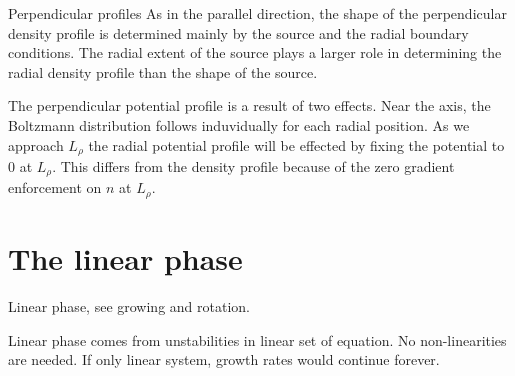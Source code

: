 Perpendicular profiles
As in the parallel direction, the shape of the perpendicular density profile is determined mainly by the source and the radial boundary conditions.
The radial extent of the source plays a larger role in determining the radial density profile than the shape of the source.

The perpendicular potential profile is a result of two effects.
Near the axis, the Boltzmann distribution follows induvidually for each radial position.
As we approach $L_\rho$ the radial potential profile will be effected by fixing the potential to $0$ at $L_\rho$.
This differs from the density profile because of the zero gradient enforcement on $n$ at $L_\rho$.

\section{The linear phase}
Linear phase, see growing and rotation.

Linear phase comes from unstabilities in linear set of equation.
No non-linearities are needed.
If only linear system, growth rates would continue forever.

